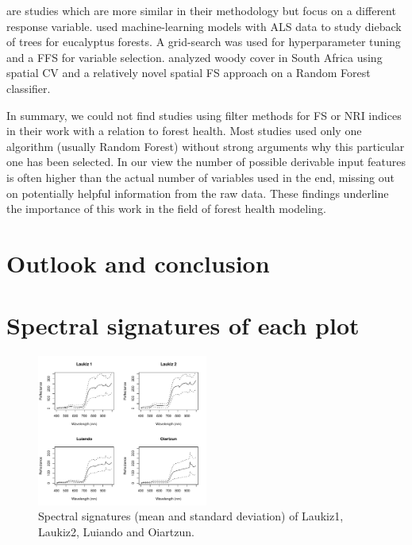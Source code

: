 \documentclass[letterpaper, journal]{IEEEtran}
\begin{document}
\cite{shendryk2016, ludwig2019} are studies which are more similar in their methodology but focus on a different response variable.
\cite{shendryk2016} used machine-learning models with \ac{ALS} data to study dieback of trees for eucalyptus forests.
A grid-search was used for hyperparameter tuning and a \ac{FFS} for variable selection.
\cite{ludwig2019} analyzed woody cover in South Africa using spatial \ac{CV} and a relatively novel spatial \ac{FS} approach \cite{meyer2018} on a Random Forest classifier.

In summary, we could not find studies using filter methods for \ac{FS} or \ac{NRI} indices in their work with a relation to forest health.
Most studies used only one algorithm (usually Random Forest) without strong arguments why this particular one has been selected.
In our view the number of possible derivable input features is often higher than the actual number of variables used in the end, missing out on potentially helpful information from the raw data.
These findings underline the importance of this work in the field of forest health modeling.

\section{Outlook and conclusion}

\appendices

\section{Spectral signatures of each plot}

\begin{figure} [h]
\begin{center}
\includegraphics[width=0.5\textwidth] {spectral-signatures-1.pdf}
\caption{Spectral signatures (mean and standard deviation) of Laukiz1, Laukiz2, Luiando and Oiartzun.}
\label{fig:spectral-signatures}
\end{center}
\end{figure}
\end{document}
